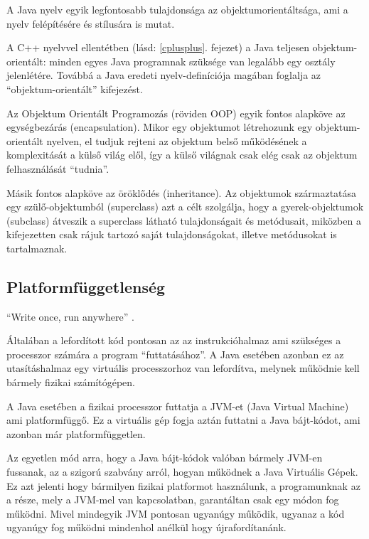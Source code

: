 \documentclass[a4paper,12pt]{report}
\begin{document}
A Java nyelv egyik legfontosabb tulajdonsága az objektumorientáltsága, ami a nyelv felépítésére és stílusára is mutat. 

\vspace{2mm}
A C++ nyelvvel ellentétben (lásd: \ref{cplusplus}. fejezet) a Java teljesen objektum-orientált: minden egyes Java programnak szüksége van legalább egy osztály jelenlétére. Továbbá a Java eredeti nyelv-definíciója magában foglalja az ``objektum-orientált'' kifejezést.

\vspace{2mm}
Az Objektum Orientált Programozás (röviden OOP) egyik fontos alapköve az egységbezárás (encapsulation). Mikor egy objektumot létrehozunk egy objektum-orientált nyelven, el tudjuk rejteni az objektum belső működésének a komplexitását a külső világ elől, így a külső világnak csak elég csak az objektum felhasználását ``tudnia''.

\vspace{2mm}
Másik fontos alapköve az öröklődés (inheritance). Az objektumok származtatása egy szülő-objektumból (superclass) azt a célt szolgálja, hogy a gyerek-objektumok (subclass) átveszik a superclass látható tulajdonságait és metódusait, miközben a kifejezetten csak rájuk tartozó saját tulajdonságokat, illetve metódusokat is tartalmaznak.

\subsection{Platformfüggetlenség}
\label{platformfugg}

``Write once, run anywhere'' \cite{wora}.

\vspace{2mm}
Általában a lefordított kód pontosan az az instrukcióhalmaz ami szükséges a processzor számára a program ``futtatásához''. A Java esetében azonban ez az utasításhalmaz egy virtuális processzorhoz van lefordítva, melynek működnie kell bármely fizikai számítógépen.

\vspace{2mm}
A Java esetében a fizikai processzor futtatja a JVM-et (Java Virtual Machine) ami platformfüggő. Ez a virtuális gép fogja aztán futtatni a Java bájt-kódot, ami azonban már platformfüggetlen. 

\vspace{2mm}
Az egyetlen mód arra, hogy a Java bájt-kódok valóban bármely JVM-en fussanak, az a szigorú szabvány arról, hogyan működnek a Java Virtuális Gépek. Ez azt jelenti hogy bármilyen fizikai platformot használunk, a programunknak az a része, mely a JVM-mel van kapcsolatban, garantáltan csak egy módon fog működni. Mivel mindegyik JVM pontosan ugyanúgy működik, ugyanaz a kód ugyanúgy fog működni mindenhol anélkül hogy újrafordítanánk.
\end{document}
